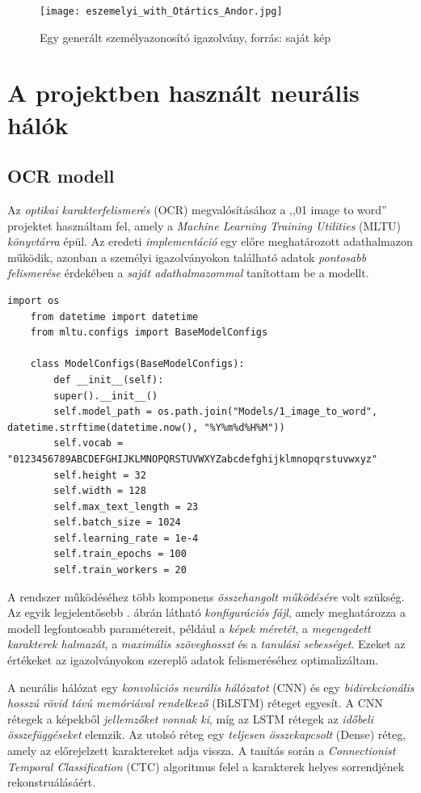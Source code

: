 \documentclass[
]{thesis-ekf}
\theoremstyle{definition}
\theoremstyle{remark}
\begin{document}
\begin{figure}[H] \centering \texttt{[image: eszemelyi\_with\_Otártics\_Andor.jpg]} \caption{Egy generált személyazonosító igazolvány, forrás: saját kép } \label{fig-eszemelyi-generated} \end{figure}

\section{A projektben használt neurális hálók}

\subsection{OCR modell}

Az \emph{optikai karakterfelismerés} (OCR) megvalósításához a ,,01 image to word'' projektet használtam fel, amely a \emph{Machine Learning Training Utilities} (MLTU) \emph{könyvtárra} épül. Az eredeti \emph{implementáció} egy előre meghatározott adathalmazon működik, azonban a személyi igazolványokon található adatok \emph{pontosabb felismerése} érdekében a \emph{saját adathalmazommal} tanítottam be a modellt. \cite{ocrProject}

\begin{lstlisting}[style=mypython, caption=Konfigurációs fájl, label=kod-python3]
	import os
	from datetime import datetime
	from mltu.configs import BaseModelConfigs
	
	class ModelConfigs(BaseModelConfigs):
		def __init__(self):
		super().__init__()
		self.model_path = os.path.join("Models/1_image_to_word", datetime.strftime(datetime.now(), "%Y%m%d%H%M"))
		self.vocab = "0123456789ABCDEFGHIJKLMNOPQRSTUVWXYZabcdefghijklmnopqrstuvwxyz"
		self.height = 32
		self.width = 128
		self.max_text_length = 23
		self.batch_size = 1024
		self.learning_rate = 1e-4
		self.train_epochs = 100
		self.train_workers = 20
\end{lstlisting}

A rendszer működéséhez több komponens \emph{összehangolt működésére} volt szükség. Az egyik legjelentősebb . ábrán látható \emph{konfigurációs fájl}, amely meghatározza a modell legfontosabb paramétereit, például a \emph{képek méretét}, a \emph{megengedett karakterek halmazát}, a \emph{maximális szöveghosszt} és a \emph{tanulási sebességet}. Ezeket az értékeket az igazolványokon szereplő adatok felismeréséhez optimalizáltam.

A neurális hálózat egy \emph{konvolúciós neurális hálózatot} (CNN) és egy \emph{bidirekcionális hosszú rövid távú memóriával rendelkező} (BiLSTM) réteget egyesít. A CNN rétegek a képekből \emph{jellemzőket vonnak ki}, míg az LSTM rétegek az \emph{időbeli összefüggéseket} elemzik. Az utolsó réteg egy \emph{teljesen összekapcsolt} (Dense) réteg, amely az előrejelzett karaktereket adja vissza. A tanítás során a \emph{Connectionist Temporal Classification} (CTC) algoritmus felel a karakterek helyes sorrendjének rekonstruálásáért.
\end{document}
